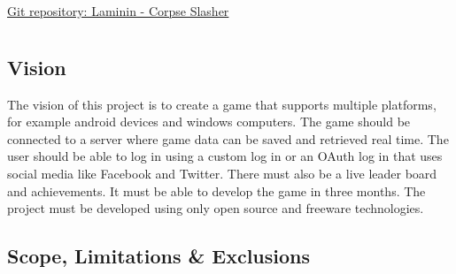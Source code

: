 \documentclass[letterpaper]{article}
\begin{document}
		\renewcommand{\cftdot}{}
		\hypersetup{linktocpage}
		\tableofcontents
		
		\begin{flushleft}
			\LARGE\href{https://github.com/njTaljaard/Laminin_CorpseSlasher/}{Git repository: Laminin - Corpse Slasher}
		\end{flushleft}
		
		\newpage
		
		\section*{\colorbox{blue}{}} 
		
		\vspace{0.2in}
		
		\subsection*{Vision}
		
		\vspace{0.1in}
		
		The vision of this project is to create a game that supports multiple platforms, for example android devices and windows computers. The game should be connected to a server where game data can be saved and retrieved real time. The user should be able to log in using a custom log in or an OAuth log in that uses social media like Facebook and Twitter. There must also be a live leader board and achievements. It must be able to develop the game in three months. The project must be developed using only open source and freeware technologies.
		
		\vspace{0.2in}
		
		\subsection*{Scope, Limitations \& Exclusions}
		
		\vspace{0.1in}
		
		
		
		\vspace{0.2in}
		
		\section*{\colorbox{blue}{}} 
		
\end{document}

